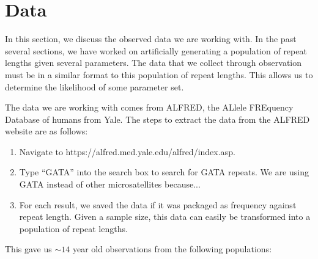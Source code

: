 \section{Data}\label{sec:d}
In this section, we discuss the observed data we are working with.
In the past several sections, we have worked on artificially generating a population of repeat lengths given several
parameters.
The data that we collect through observation must be in a similar format to this population of repeat lengths.
This allows us to determine the likelihood of some parameter set.

The data we are working with comes from ALFRED, the ALlele FREquency Database of humans from Yale.
The steps to extract the data from the ALFRED website are as follows:
\begin{enumerate}
    \item Navigate to https://alfred.med.yale.edu/alfred/index.asp.
    \item Type ``GATA'' into the search box to search for GATA repeats.
        We are using GATA instead of other microsatellites because... %
    \item For each result, we saved the data if it was packaged as frequency against repeat length.
        Given a sample size, this data can easily be transformed into a population of repeat lengths.
\end{enumerate}
This gave us $\sim 14$ year old observations from the following populations:
